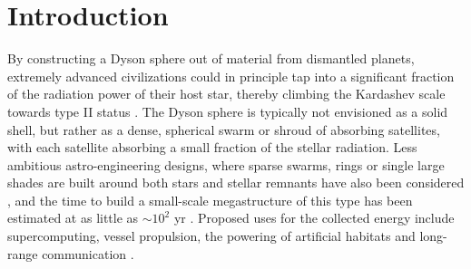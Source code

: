 \documentclass[twocolumn]{aastex6}
\begin{document}



\section{Introduction} 
\label{intro}
By constructing a Dyson sphere \citep{Dyson60} out of material from dismantled planets, extremely advanced civilizations could in principle tap into a significant fraction of the radiation power of their host star, thereby climbing the Kardashev scale towards type II status \citep{Kardashev64}. The Dyson sphere is typically not envisioned as a solid shell, but rather as a dense, spherical swarm or shroud of absorbing satellites, with each satellite absorbing a small fraction of the stellar radiation. Less ambitious astro-engineering designs, where sparse swarms, rings or single large shades are built around both stars and stellar remnants have also been considered \citep[e.g.][]{Suffern77,Wright14b,Osmanov16,Wright16}, and the time to build a small-scale megastructure of this type has been estimated at as little as $\sim 10^2$ yr \citep{Armstrong13}. Proposed uses for the collected energy include supercomputing, vessel propulsion, the powering of artificial habitats and long-range communication \citep[e.g.][]{Suffern77,Sandberg99,Arnold05,Armstrong13}. 
\end{document}
